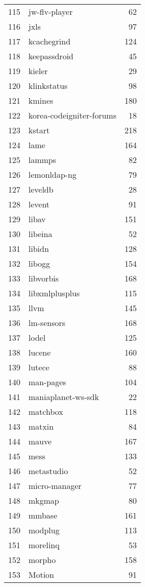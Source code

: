 \begin{table}[!ht]
\begin{tabular}{rlr}
  115 & jw-flv-player &  62 \\ 
  116 & jxls &  97 \\ 
  117 & kcachegrind & 124 \\ 
  118 & keepassdroid &  45 \\ 
  119 & kieler &  29 \\ 
  120 & klinkstatus &  98 \\ 
  121 & kmines & 180 \\ 
  122 & korea-codeigniter-forums &  18 \\ 
  123 & kstart & 218 \\ 
  124 & lame & 164 \\ 
  125 & lammps &  82 \\ 
  126 & lemonldap-ng &  79 \\ 
  127 & leveldb &  28 \\ 
  128 & levent &  91 \\ 
  129 & libav & 151 \\ 
  130 & libeina &  52 \\ 
  131 & libidn & 128 \\ 
  132 & libogg & 154 \\ 
  133 & libvorbis & 168 \\ 
  134 & libxmlplusplus & 115 \\ 
  135 & llvm & 145 \\ 
  136 & lm-sensors & 168 \\ 
  137 & lodel & 125 \\ 
  138 & lucene & 160 \\ 
  139 & lutece &  88 \\ 
  140 & man-pages & 104 \\ 
  141 & maniaplanet-ws-sdk &  22 \\ 
  142 & matchbox & 118 \\ 
  143 & matxin &  84 \\ 
  144 & mauve & 167 \\ 
  145 & mess & 133 \\ 
  146 & metastudio &  52 \\ 
  147 & micro-manager &  77 \\ 
  148 & mkgmap &  80 \\ 
  149 & mmbase & 161 \\ 
  150 & modplug & 113 \\ 
  151 & morelinq &  53 \\ 
  152 & morpho & 158 \\ 
  153 & Motion &  91 \\ 

\end{tabular}
\end{table}
